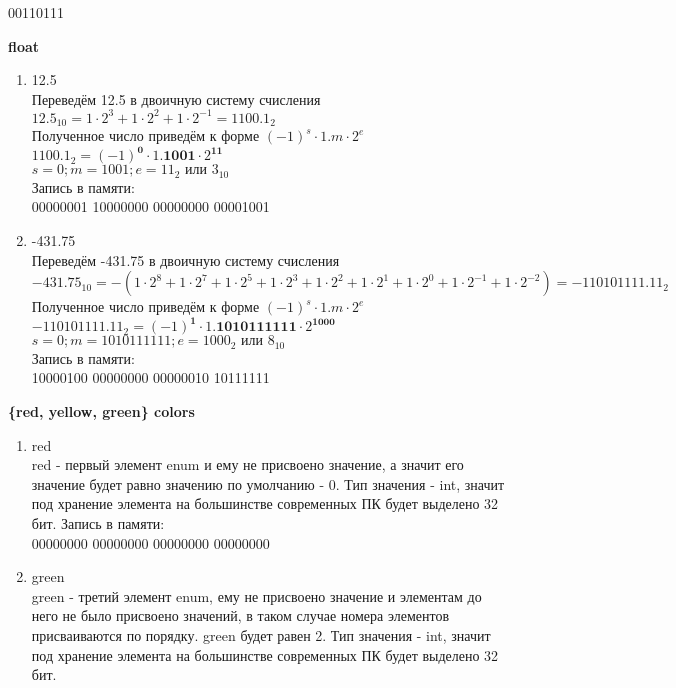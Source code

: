 \documentclass[a4paper,14pt]{extarticle}
\begin{document}
\begin{enumerate}
\begin{enumerate}[1. ]
  00110111
\end{enumerate}
\textbf{float}
\begin{enumerate}[1. ]
  \item 12.5\\
  Переведём 12.5 в двоичную систему счисления\\
  $12.5_{10} = 1 \cdot 2 ^ 3 + 1 \cdot 2 ^ 2 + 1 \cdot 2 ^ {-1} = 1100.1_2$\\
  Полученное число приведём к форме $(-1)^s \cdot 1.m \cdot 2^e$\\
  $1100.1_2 = (-1) ^ \textbf{0} \cdot 1.\textbf{1001} \cdot 2 ^ {\textbf{11}}$\\
  $s = 0; m = 1001; e = 11_2 \textit{ или } 3_{10}$\\
  Запись в памяти:\\
  00000001 10000000 00000000 00001001
  \item -431.75\\
  Переведём -431.75 в двоичную систему счисления\\
  $-431.75_{10} = -(1 \cdot 2 ^ 8 + 1 \cdot 2 ^ 7 + 1 \cdot 2 ^ 5 + 1 \cdot 2 ^ 3 + 1 \cdot 2 ^ 2 + 1 \cdot 2 ^ 1 + 1 \cdot 2 ^ 0 + 1 \cdot 2 ^ {-1} + 1 \cdot 2 ^ {-2}) = -110101111.11_2$\\
  Полученное число приведём к форме $(-1)^s \cdot 1.m \cdot 2^e$\\
  $-110101111.11_2 = (-1) ^ \textbf{1} \cdot 1.\textbf{1010111111} \cdot 2 ^ {\textbf{1000}}$\\
  $s = 0; m = 1010111111; e = 1000_2 \textit{ или } 8_{10}$\\
  Запись в памяти:\\
  10000100 00000000 00000010 10111111
\end{enumerate}
\textbf{\{red, yellow, green\} colors}
\begin{enumerate}[1. ]
  \item red\\
  red - первый элемент enum и ему не присвоено значение, а значит его значение будет равно значению по 
  умолчанию - 0. Тип значения - int, значит под хранение элемента на большинстве современных ПК будет выделено 32 бит.
  Запись в памяти:\\
  00000000 00000000 00000000 00000000
  \item green\\
  green - третий элемент enum, ему не присвоено значение и элементам до него не было присвоено значений, в таком случае номера элементов присваиваются по порядку.
  green будет равен 2. Тип значения - int, значит под хранение элемента на большинстве современных ПК будет выделено 32 бит.

\end{enumerate}
\end{enumerate}
\end{document}

